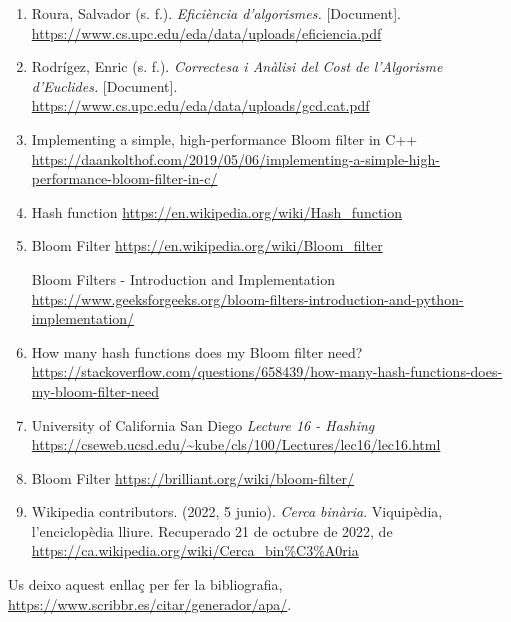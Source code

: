\documentclass[titlepage]{article}
\begin{document}
\begin{enumerate}
    \item Roura, Salvador (s. f.). \textit{Eficiència d'algorismes.} [Document]. \url{https://www.cs.upc.edu/eda/data/uploads/eficiencia.pdf}

    \item Rodrígez, Enric (s. f.). \textit{Correctesa i Anàlisi del Cost de l'Algorisme d'Euclides.} [Document]. \url{https://www.cs.upc.edu/eda/data/uploads/gcd.cat.pdf}

    \item Implementing a simple, high-performance Bloom filter in C++ \url{https://daankolthof.com/2019/05/06/implementing-a-simple-high-performance-bloom-filter-in-c/}

    \item Hash function \url{https://en.wikipedia.org/wiki/Hash_function}

    \item Bloom Filter \url{https://en.wikipedia.org/wiki/Bloom_filter}

    \itme Bloom Filters - Introduction and Implementation \url{https://www.geeksforgeeks.org/bloom-filters-introduction-and-python-implementation/}

    \item How many hash functions does my Bloom filter need? \url{https://stackoverflow.com/questions/658439/how-many-hash-functions-does-my-bloom-filter-need}

    \item University of California San Diego \textit{Lecture 16 - Hashing} \url{https://cseweb.ucsd.edu/~kube/cls/100/Lectures/lec16/lec16.html}

    \item Bloom Filter \url{https://brilliant.org/wiki/bloom-filter/}

    \item Wikipedia contributors. (2022, 5 junio).\textit{ Cerca binària}. Viquipèdia, l’enciclopèdia lliure. Recuperado 21 de octubre de 2022, de \url{https://ca.wikipedia.org/wiki/Cerca_bin%C3%A0ria }   
\end{enumerate}

Us deixo aquest enllaç per fer la bibliografia, \url{https://www.scribbr.es/citar/generador/apa/}.
\end{document}
